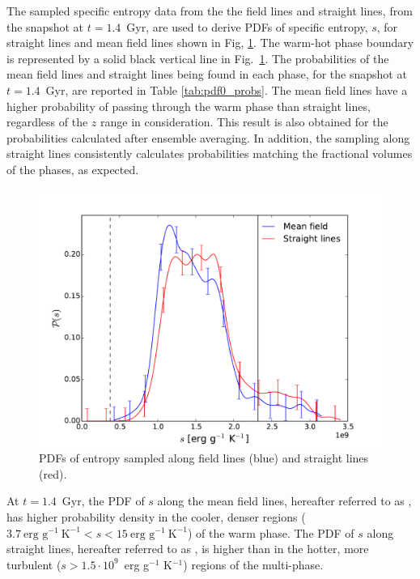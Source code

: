 \documentclass[useAMS,usenatbib]{mn2e}
\begin{document}
The sampled specific entropy data from the the field lines and straight lines, from the snapshot at $t=1.4$~Gyr, are used to derive PDFs of specific entropy, $s$, for straight lines and mean field lines shown in Fig, \ref{fig:res_pdf0}. The warm-hot phase boundary is represented by a solid black vertical line in Fig.~\ref{fig:res_pdf0}. 
The probabilities of the mean field lines and straight lines being found in each phase, for the snapshot at $t=1.4$~Gyr, are reported in Table \ref{tab:pdf0_probs}. The mean field lines have a higher probability of passing through the warm phase than straight lines, regardless of the $z$ range in consideration. This result is also obtained for the probabilities calculated after ensemble averaging. In addition, the sampling along straight lines consistently calculates probabilities matching the fractional volumes of the phases, as expected.
\begin{figure}
  \centering 
  \includegraphics[width=\linewidth]{fig/all0.pdf}
  \caption{PDFs of entropy sampled along field lines (blue) and straight lines (red).}
  \label{fig:res_pdf0}
\end{figure} 
At $t=1.4$~Gyr, the PDF of $s$ along the mean field lines, hereafter referred to as \meanprs, has higher probability density in the cooler, denser regions ($3.7~\text{erg g}^{-1}~\text{K}^{-1}<s<15~\text{erg g}^{-1}~\text{K}^{-1}$) of the warm phase. The PDF of $s$ along straight lines, hereafter referred to as \stprs, is higher than \meanprs in the hotter, more turbulent ($s>1.5\cdot10^9$~erg g$^{-1}$ K$^{-1}$) regions of the multi-phase. 
\end{document}
